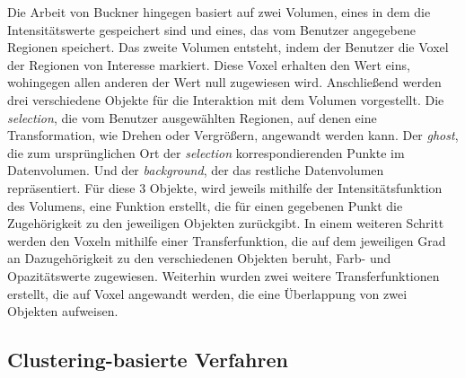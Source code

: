 Die Arbeit von Buckner \cite{bruckner2005volumeshop} hingegen basiert auf zwei Volumen, eines in dem die Intensitätswerte gespeichert sind und eines, das vom Benutzer angegebene Regionen speichert.
\newline
Das zweite Volumen entsteht, indem der Benutzer die Voxel der Regionen von Interesse markiert. Diese Voxel erhalten den Wert eins, wohingegen allen anderen der Wert null zugewiesen wird.
\newline
Anschließend werden drei verschiedene Objekte für die Interaktion mit dem Volumen vorgestellt. Die \textit{selection}, die vom Benutzer ausgewählten Regionen, auf denen eine Transformation, wie Drehen oder Vergrößern, angewandt werden kann. Der \textit{ghost}, die zum ursprünglichen Ort der \textit{selection} korrespondierenden Punkte im Datenvolumen. Und der \textit{background}, der das restliche Datenvolumen repräsentiert.
\newline
Für diese 3 Objekte, wird jeweils mithilfe der Intensitätsfunktion des Volumens, eine Funktion erstellt, die für einen gegebenen Punkt die Zugehörigkeit zu den jeweiligen Objekten zurückgibt.
\newline
In einem weiteren Schritt werden den Voxeln mithilfe einer Transferfunktion, die auf dem jeweiligen Grad an Dazugehörigkeit zu den verschiedenen Objekten beruht, Farb- und Opazitätswerte zugewiesen.
\newline
Weiterhin wurden zwei weitere Transferfunktionen erstellt, die auf Voxel angewandt werden, die eine Überlappung von zwei Objekten aufweisen.



\subsection{Clustering-basierte Verfahren}

